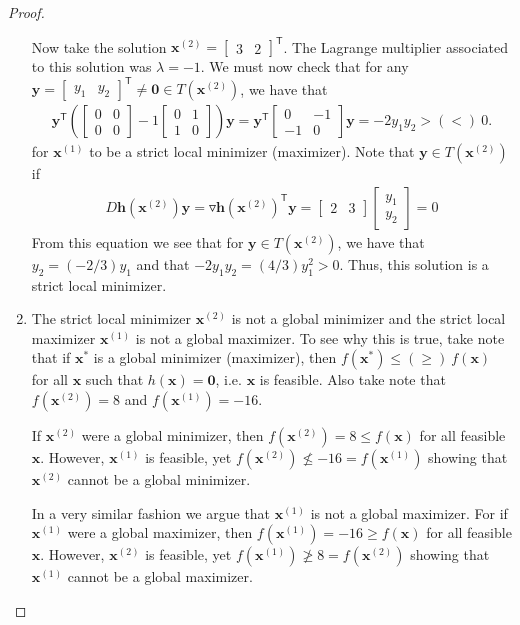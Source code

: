 \documentclass[12pt]{article}
\theoremstyle{definition}
\newcommand{\vc}[1]{\boldsymbol{#1}}
\newcommand{\tran}{\mathsf{T}}
\begin{document}
\begin{proof}
\begin{enumerate}
      Now take the solution $\vc{x}^{(2)} = \begin{bmatrix}3 & 2\end{bmatrix}^\tran$.
      The Lagrange multiplier associated to this solution was $\lambda=-1$. We must
      now check that for any $\vc{y} = \begin{bmatrix}y_1 & y_2\end{bmatrix}^\tran \neq \vc{0}\in T(\vc{x}^{(2)})$, we have that
      \begin{align*}
        \vc{y}^\tran \left(\begin{bmatrix}0 & 0 \\ 0 & 0\end{bmatrix} -1 \begin{bmatrix}0 & 1 \\ 1 & 0\end{bmatrix}\right) \vc{y} =
        \vc{y}^\tran \begin{bmatrix}0 & -1 \\ -1 & 0\end{bmatrix} \vc{y} = -2y_1 y_2 > (<)\ 0.
      \end{align*}
      for $\vc{x}^{(1)}$ to be a strict local minimizer (maximizer).
      Note that $\vc{y}\in T(\vc{x}^{(2)})$ if
      \begin{align*}
        D \vc{h}(\vc{x}^{(2)})\vc{y} = \triangledown \vc{h}(\vc{x}^{(2)})^\tran \vc{y} = \begin{bmatrix}2 & 3\end{bmatrix}\begin{bmatrix}y_1 \\ y_2\end{bmatrix} = 0
      \end{align*}
      From this equation we see that for $\vc{y}\in T(\vc{x}^{(2)})$, we have that $y_2 = (-2/3 )y_1$ and that $-2y_1 y_2 = (4/3)y_1^2 > 0$.
      Thus, this solution is a strict local minimizer.

    \item The strict local minimizer $\vc{x}^{(2)}$ is not a global minimizer and the strict local maximizer $\vc{x}^{(1)}$ is not a global maximizer.
      To see why this is true, take note that if $\vc{x}^{*}$ is a global minimizer (maximizer),
      then $f(\vc{x}^{*}) \leq (\geq)\ f(\vc{x})$ for all $\vc{x}$ such that $h(\vc{x})=\vc{0}$, i.e. $\vc{x}$ is feasible.
      Also take note that $f(\vc{x}^{(2)}) = 8$ and $f(\vc{x}^{(1)}) = -16$.

      If $\vc{x}^{(2)}$ were a global minimizer, then $f(\vc{x}^{(2)})=8 \leq  f(\vc{x})$
      for all feasible $\vc{x}$. However, $\vc{x}^{(1)}$ is feasible, yet $f(\vc{x}^{(2)}) \nleq -16 = f(\vc{x}^{(1)})$
      showing that $\vc{x}^{(2)}$ cannot be a global minimizer.

      In a very similar fashion we argue that $\vc{x}^{(1)}$ is not a global maximizer.
      For if $\vc{x}^{(1)}$ were a global maximizer, then $f(\vc{x}^{(1)})=-16 \geq  f(\vc{x})$
      for all feasible $\vc{x}$. However, $\vc{x}^{(2)}$ is feasible, yet $f(\vc{x}^{(1)}) \ngeq 8 = f(\vc{x}^{(2)})$
      showing that $\vc{x}^{(1)}$ cannot be a global maximizer.
  \end{enumerate}
\end{proof}
\end{document}
